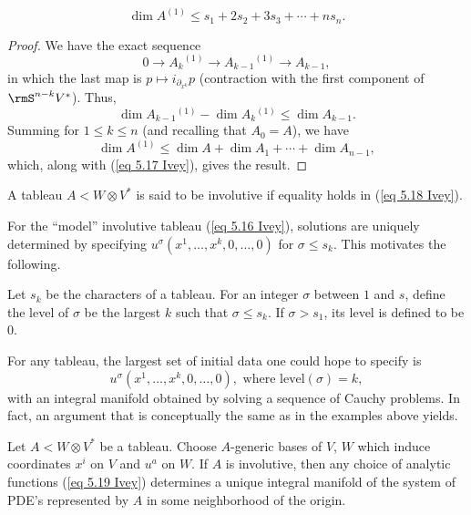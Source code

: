 \begin{prop}
    \[\dim A^{(1)}\leq s_1+2s_2+3s_3+\cdots +ns_n. \label{eq 5.18 Ivey}\]
\end{prop}
\begin{proof}
    We have the exact sequence 
    \[0\to A_k{}^{(1)}\to A_{k-1}{}^{(1)}\to A_{k-1},\]
    in which the last map is $p\mapsto i_{\partial_{x^k}}p$ (contraction with the first component of $\rmS^{n-k}V^\ast$). Thus, 
    \[\dim A_{k-1}{}^{(1)}-\dim A_k{}^{(1)}\leq \dim A_{k-1}.\]   
    Summing for $1\leq k\leq n$ (and recalling that $A_0=A$), we have 
    \[\dim A^{(1)}\leq \dim A+\dim A_1+\cdots +\dim A_{n-1},\]
    which, along with (\ref{eq 5.17 Ivey}), gives the result.
\end{proof}
\begin{defn}
    A tableau $A<W\otimes V^\ast$ is said to be involutive if equality holds in (\ref{eq 5.18 Ivey}).
\end{defn}


For the ``model'' involutive tableau (\ref{eq 5.16 Ivey}), solutions are uniquely determined by specifying $u^\sigma(x^1,\ldots,x^k,0,\ldots,0)$ for $\sigma\leq s_k$. This motivates the following.

\begin{defn}[Level]
    Let $s_k$ be the characters of a tableau. For an integer $\sigma$ between $1$ and $s$, define the level of $\sigma$ be the largest $k$ such that $\sigma\leq s_k$. If $\sigma>s_1$, its level is defined to be $0$.
\end{defn}

For any tableau, the largest set of initial data one could hope to specify is 
\[u^\sigma(x^1,\ldots,x^k,0,\ldots,0),\text{ where }\mathrm{level}(\sigma)=k,\label{eq 5.19 Ivey}\]
with an integral manifold obtained by solving a sequence of Cauchy problems. In fact, an argument that is conceptually the same as in the examples above yields.

\begin{thm}\label{thm 5.5.7 Ivey}
    Let $A<W\otimes V^\ast$ be a tableau. Choose $A$-generic bases of $V$, $W$ which induce coordinates $x^i$ on $V$ and $u^a$ on $W$. If $A$ is involutive, then any choice of analytic functions (\ref{eq 5.19 Ivey}) determines a unique integral manifold of the system of PDE's represented by $A$ in some neighborhood of the origin.
\end{thm}

